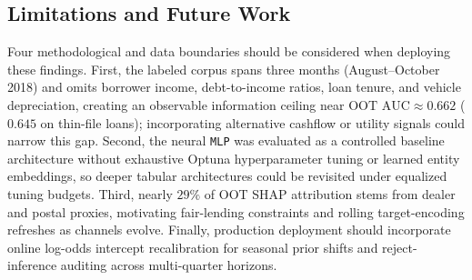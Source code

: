 \subsection{Limitations and Future Work}
Four methodological and data boundaries should be considered when deploying these findings. First, the labeled corpus spans three months (August--October 2018) and omits borrower income, debt-to-income ratios, loan tenure, and vehicle depreciation, creating an observable information ceiling near $\text{OOT AUC} \approx 0.662$ ($0.645$ on thin-file loans); incorporating alternative cashflow or utility signals could narrow this gap. Second, the neural \texttt{MLP} was evaluated as a controlled baseline architecture without exhaustive Optuna hyperparameter tuning or learned entity embeddings, so deeper tabular architectures could be revisited under equalized tuning budgets. Third, nearly $29\%$ of OOT SHAP attribution stems from dealer and postal proxies, motivating fair-lending constraints and rolling target-encoding refreshes as channels evolve. Finally, production deployment should incorporate online log-odds intercept recalibration for seasonal prior shifts and reject-inference auditing across multi-quarter horizons.
